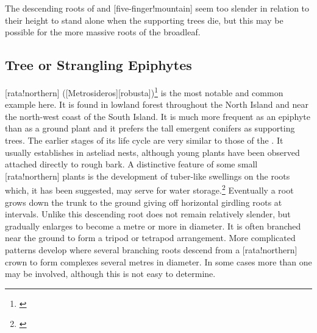 The descending roots of  and [five-finger!mountain] seem too slender in relation to their height to stand alone when the supporting trees die, but this may be possible for the more massive roots of the broadleaf.

\subsection{Tree or Strangling Epiphytes}

[rata!northern] ([Metrosideros][robusta])\footnote{\cite{dawson1967growth}} is the most notable and common example here.
It is found in lowland forest throughout the North Island and near the north-west coast of the South Island.
It is much more frequent as an epiphyte than as a ground plant and it prefers the tall emergent conifers as supporting trees.
The earlier stages of its life cycle are very similar to those of the .
It usually establishes in asteliad nests, although young plants have been observed attached directly to rough bark.
A distinctive feature of some small [rata!northern] plants is the development of tuber-like swellings on the roots which, it has been suggested, may serve for water storage.\footnote{\cite{beddie1953root}}
Eventually a root grows down the trunk to the ground giving off horizontal girdling roots at intervals.
Unlike  this descending root does not remain relatively slender, but gradually enlarges to become a metre or more in diameter.
It is often branched near the ground to form a tripod or tetrapod arrangement.
More complicated patterns develop where several branching roots descend from a [rata!northern] crown to form complexes several metres in diameter.
In some cases more than one  may be involved, although this is not easy to determine.

